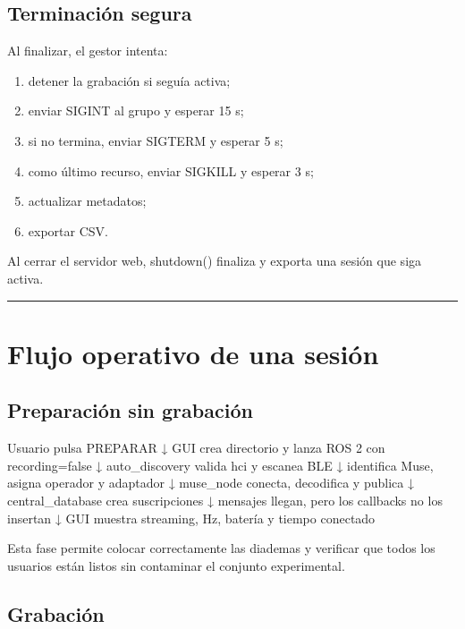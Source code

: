 \documentclass[11pt,a4paper]{article}
\begin{document}
\subsection{Terminación segura}

Al finalizar, el gestor intenta:

\begin{enumerate}
\item detener la grabación si seguía activa;
\item enviar {\ttfamily\small SIGINT} al grupo y esperar 15 s;
\item si no termina, enviar {\ttfamily\small SIGTERM} y esperar 5 s;
\item como último recurso, enviar {\ttfamily\small SIGKILL} y esperar 3 s;
\item actualizar metadatos;
\item exportar CSV.
\end{enumerate}

Al cerrar el servidor web, {\ttfamily\small shutdown()} finaliza y exporta una sesión que siga activa.

\medskip\hrule\medskip

\section{Flujo operativo de una sesión}

\subsection{Preparación sin grabación}

\begin{MuseCode}
Usuario pulsa PREPARAR
        ↓
GUI crea directorio y lanza ROS 2 con recording=false
        ↓
auto_discovery valida hci y escanea BLE
        ↓
identifica Muse, asigna operador y adaptador
        ↓
muse_node conecta, decodifica y publica
        ↓
central_database crea suscripciones
        ↓
mensajes llegan, pero los callbacks no los insertan
        ↓
GUI muestra streaming, Hz, batería y tiempo conectado
\end{MuseCode}

Esta fase permite colocar correctamente las diademas y verificar que todos los usuarios están listos sin contaminar el conjunto experimental.

\subsection{Grabación}
\end{document}
